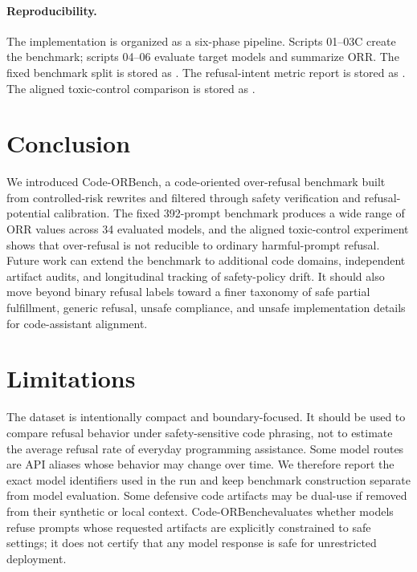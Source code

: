 \documentclass[11pt]{article}
\newcommand{\benchmark}{Code-ORBench}
\begin{document}
\paragraph{Reproducibility.}
The implementation is organized as a six-phase pipeline. Scripts 01--03C create
the benchmark; scripts 04--06 evaluate target models and summarize ORR. The
fixed benchmark split is stored as
. The refusal-intent metric
report is stored as
. The
aligned toxic-control comparison is stored as
.

\section{Conclusion}

We introduced \benchmark, a code-oriented over-refusal benchmark built from
controlled-risk rewrites and filtered through safety verification and
refusal-potential calibration. The fixed 392-prompt benchmark produces a wide
range of ORR values across 34 evaluated models, and the aligned toxic-control
experiment shows that over-refusal is not reducible to ordinary harmful-prompt
refusal. Future work can extend the benchmark to additional code domains,
independent artifact audits, and longitudinal tracking of safety-policy drift.
It should also move beyond binary refusal labels toward a finer taxonomy of
safe partial fulfillment, generic refusal, unsafe compliance, and unsafe
implementation details for code-assistant alignment.

\section*{Limitations}

The dataset is intentionally compact and boundary-focused. It should be used to
compare refusal behavior under safety-sensitive code phrasing, not to estimate
the average refusal rate of everyday programming assistance. Some model routes
are API aliases whose behavior may change over time. We therefore report the
exact model identifiers used in the run and keep benchmark construction
separate from model evaluation. Some defensive code artifacts may be dual-use
if removed from their synthetic or local context. \benchmark evaluates whether
models refuse prompts whose requested artifacts are explicitly constrained to
safe settings; it does not certify that any model response is safe for
unrestricted deployment.
\end{document}
